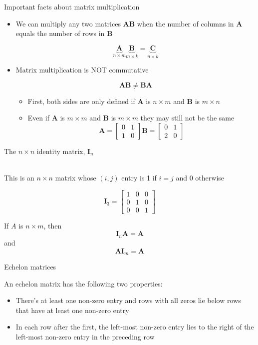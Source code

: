 \documentclass[10pt]{seminar}
\begin{document}
\begin{slide}
\newslide

Important facts about matrix multiplication

\begin{itemize}
\item We can multiply any two matrices $\mathbf{AB}$ when the number of columns in $\mathbf{A}$ equals the number of rows in $\mathbf{B}$

$$\underbrace{\mathbf{A}}_{n\times m}\underbrace{\mathbf{B}}_{m\times k}=\underbrace{\mathbf{C}}_{n\times k}$$
\item Matrix multiplication is NOT commutative

$$\mathbf{AB}\not=\mathbf{BA}$$
\begin{itemize}
\item First, both sides are only defined if $\mathbf{A}$ is $n\times m$ and $\mathbf{B}$ is $m\times n$
\item Even if $\mathbf{A}$ is $m\times m$ and $\mathbf{B}$ is $m\times m$ they may still not be the same
$$\mathbf{A}=
\begin{bmatrix}
0 & 1\\
1& 0
\end{bmatrix}
\mathbf{B}=
\begin{bmatrix}
0& 1\\
2& 0
\end{bmatrix}
$$
\end{itemize}

\end{itemize}

\newslide

The $n\times n$ identity matrix, $\mathbf{I}_n$

\ \\This is an $n\times n$ matrix whose $(i, j)$ entry is 1 if $i=j$ and $0$ otherwise

$$\mathbf{I}_3=
\begin{bmatrix}
 1 & 0& 0\\
 0 & 1& 0\\
 0& 0& 1
\end{bmatrix}$$

If $A$ is $n\times m$, then $$\mathbf{I}_n\mathbf{A}=\mathbf{A}$$ and $$\mathbf{A}\mathbf{I}_m=\mathbf{A}$$

\newslide
Echelon matrices

An echelon matrix has the following two properties:

\begin{itemize}
\item[1] There's at least one non-zero entry and rows with all zeros lie below rows that have at least one non-zero entry
\item[2] In each row after the first, the left-most non-zero entry lies to the right of the left-most non-zero entry in the preceding row



\end{itemize}
\end{slide}
\end{document}

